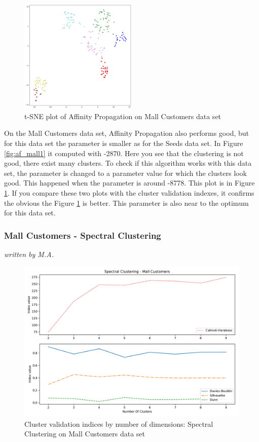  \begin{figure}[!ht]
 		\begin{center}
 			\includegraphics[width=0.5\textwidth]{images/af_mallcustomers8778.png}
 		\end{center}
 		\caption{t-SNE plot of Affinity Propagation on Mall Customers data set}
 		\label{fig:af_mall2}
 	\end{figure}
 
On the Mall Customers data set, Affinity Propagation also performs good, but for this data set the parameter is smaller as for the Seeds data set. In Figure \ref{fig:af_mall1} it computed with -2870. Here you see that the clustering is not good, there exist many clusters. To check if this algorithm works with this data set, the parameter is changed to a parameter value for which the clusters look good. This happened when the parameter is around -8778. This plot is in Figure \ref{fig:af_mall2}. If you compare these two plots with the cluster validation indexes, it confirms the obvious the Figure \ref{fig:af_mall2} is better. This parameter is also near to the optimum for this data set. 

\subsubsection{Mall Customers - Spectral Clustering}
\textit{written by M.A.}

\begin{figure}[H]
    \centering
    \includegraphics[width=1\textwidth]{images/Spectral_Clustering_-_Mall_Customers.pdf}
    \caption{Cluster validation indices by number of dimensions: Spectral Clustering on Mall Customers data set}
    \label{fig:my_label2}
\end{figure}

